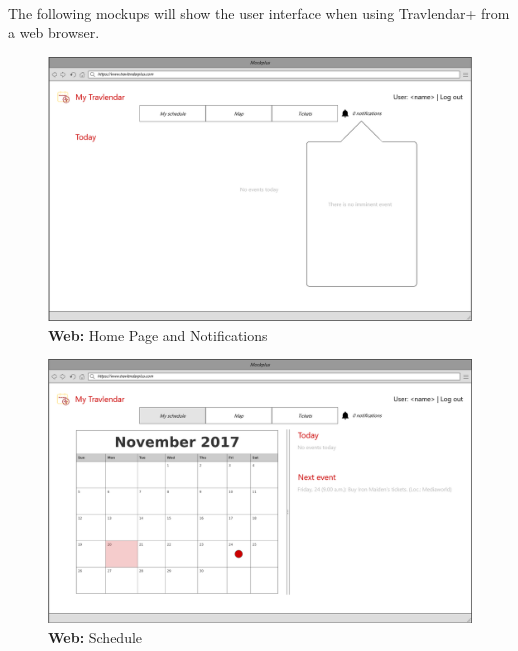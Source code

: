 \documentclass{article}
\begin{document}
		\paragraph{}The following mockups will show the user interface when using Travlendar+ from a web browser.
			\begin{figure}[H]
			\includegraphics[width=\linewidth]{Images/Mockup/Web/07-web_homepage.png}
			\caption{\textbf{Web:} Home Page and Notifications}
			\label{fig:MU7}
			\end{figure}
			\begin{figure}[H]
			\includegraphics[width=\linewidth]{Images/Mockup/Web/08-web_Schedule.png}
			\caption{\textbf{Web:} Schedule}
			\label{fig:MU8}
			\end{figure}
\end{document}
